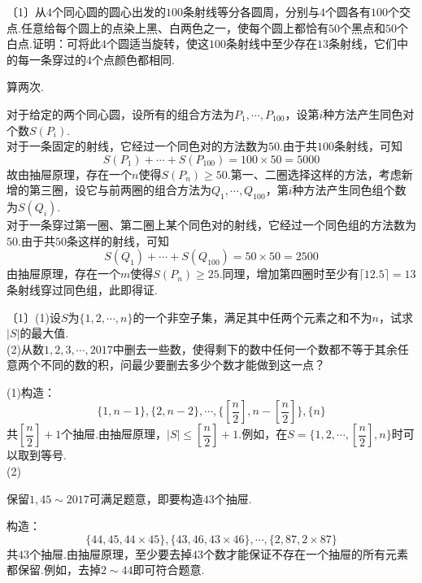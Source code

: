 \documentclass[lang=cn, zihao=4.5]{elegantbook}
\newcommand{\nd}[1]{〔#1〕}
\begin{document}
\begin{example} %
	\nd{1}从$4$个同心圆的圆心出发的$100$条射线等分各圆周，分别与$4$个圆各有$100$个交点.任意给每个圆上的点染上黑、白两色之一，使每个圆上都恰有$50$个黑点和$50$个白点.证明：可将此$4$个圆适当旋转，使这$100$条射线中至少存在$13$条射线，它们中的每一条穿过的$4$个点颜色都相同.
\end{example}
\begin{hint}
	算两次.
\end{hint}
\begin{solution}
	对于给定的两个同心圆，设所有的组合方法为$P_1, \cdots ,P_{100}$，设第$i$种方法产生同色对个数$S(P_i)$. \\
	对于一条固定的射线，它经过一个同色对的方法数为$50$.由于共$100$条射线，可知$$S(P_1) + \cdots + S(P_{100}) = 100 \times 50 = 5000$$
	故由抽屉原理，存在一个$n$使得$S(P_n) \geq 50$.第一、二圈选择这样的方法，考虑新增的第三圈，设它与前两圈的组合方法为$Q_1, \cdots ,Q_{100}$，第$i$种方法产生同色组个数为$S(Q_i)$. \\
	对于一条穿过第一圈、第二圈上某个同色对的射线，它经过一个同色组的方法数为$50$.由于共$50$条这样的射线，可知$$S(Q_1) + \cdots + S(Q_{100}) = 50 \times 50 = 2500$$
	由抽屉原理，存在一个$m$使得$S(P_n) \geq 25$.同理，增加第四圈时至少有$\lceil 12.5 \rceil = 13$条射线穿过同色组，此即得证.
\end{solution}

\begin{example} %
	\nd{1}(1)设$S$为$\{ 1,2, \cdots ,n \}$的一个非空子集，满足其中任两个元素之和不为$n$，试求$|S|$的最大值. \\
	(2)从数$1,2,3, \cdots ,2017$中删去一些数，使得剩下的数中任何一个数都不等于其余任意两个不同的数的积，问最少要删去多少个数才能做到这一点？
\end{example}
\begin{solution}
	(1)构造：$$\{ 1,n-1 \},\{ 2,n-2 \}, \cdots , \{ \left[ \frac{n}{2} \right], n-\left[ \frac{n}{2} \right] \},\{ n \}$$
	共$ \left[ \dfrac{n}{2} \right]+1$个抽屉.由抽屉原理，$|S| \leq \left[ \dfrac{n}{2} \right]+1$.例如，在$S = \{ 1,2, \cdots , \left[ \dfrac{n}{2} \right] ,n \}$时可以取到等号. \\
	(2)\begin{guess}
		保留$1,45 \sim 2017$可满足题意，即要构造$43$个抽屉.
	\end{guess}
	构造：$$\{ 44,45,44 \times 45 \}, \{ 43,46,43 \times 46 \}, \cdots , \{ 2,87,2\times 87 \}$$
	共$43$个抽屉.由抽屉原理，至少要去掉$43$个数才能保证不存在一个抽屉的所有元素都保留.例如，去掉$2 \sim 44$即可符合题意.
\end{solution}
\end{document}
